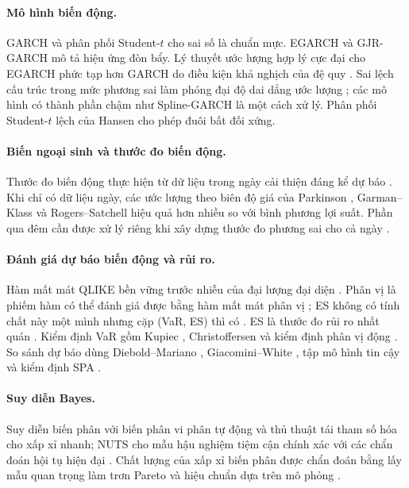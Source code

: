 \documentclass[12pt,a4paper]{article}
\theoremstyle{definition}
\theoremstyle{remark}
\begin{document}
\paragraph{Mô hình biến động.} GARCH \cite{bollerslev1986} và phân phối Student-$t$ cho sai số \cite{bollerslev1987} là chuẩn mực. EGARCH \cite{nelson1991} và GJR-GARCH \cite{gjr1993} mô tả hiệu ứng đòn bẩy. Lý thuyết ước lượng hợp lý cực đại cho EGARCH phức tạp hơn GARCH do điều kiện khả nghịch của đệ quy \cite{straumann2006}. Sai lệch cấu trúc trong mức phương sai làm phóng đại độ dai dẳng ước lượng \cite{lamoureux1990}; các mô hình có thành phần chậm như Spline-GARCH \cite{engle_rangel2008} là một cách xử lý. Phân phối Student-$t$ lệch của Hansen \cite{hansen1994} cho phép đuôi bất đối xứng.

\paragraph{Biến ngoại sinh và thước đo biến động.} Thước đo biến động thực hiện từ dữ liệu trong ngày cải thiện đáng kể dự báo \cite{hhs2012,shephard2010,corsi2009}. Khi chỉ có dữ liệu ngày, các ước lượng theo biên độ giá của Parkinson \cite{parkinson1980}, Garman--Klass \cite{garmanklass1980} và Rogers--Satchell \cite{rogers1991} hiệu quả hơn nhiều so với bình phương lợi suất. Phần qua đêm cần được xử lý riêng khi xây dựng thước đo phương sai cho cả ngày \cite{hansenlunde2005rv}.

\paragraph{Đánh giá dự báo biến động và rủi ro.} Hàm mất mát QLIKE bền vững trước nhiễu của đại lượng đại diện \cite{patton2011,hansenlunde2006}. Phân vị là phiếm hàm có thể đánh giá được bằng hàm mất mát phân vị \cite{koenker1978,gneiting2011}; ES không có tính chất này một mình nhưng cặp (VaR, ES) thì có \cite{fissler2016,pzc2019}. ES là thước đo rủi ro nhất quán \cite{artzner1999,acerbitasche2002}. Kiểm định VaR gồm Kupiec \cite{kupiec1995}, Christoffersen \cite{christoffersen1998} và kiểm định phân vị động \cite{engle_manganelli2004}. So sánh dự báo dùng Diebold--Mariano \cite{dm1995}, Giacomini--White \cite{giacomini2006}, tập mô hình tin cậy \cite{hln2011} và kiểm định SPA \cite{hansen2005,white2000}.

\paragraph{Suy diễn Bayes.} Suy diễn biến phân \cite{blei2017} với biến phân vi phân tự động \cite{kucukelbir2017} và thủ thuật tái tham số hóa \cite{kingma2014} cho xấp xỉ nhanh; NUTS \cite{hoffman2014} cho mẫu hậu nghiệm tiệm cận chính xác với các chẩn đoán hội tụ hiện đại \cite{vehtari2021}. Chất lượng của xấp xỉ biến phân được chẩn đoán bằng lấy mẫu quan trọng làm trơn Pareto \cite{yao2018} và hiệu chuẩn dựa trên mô phỏng \cite{talts2018}.
\end{document}
